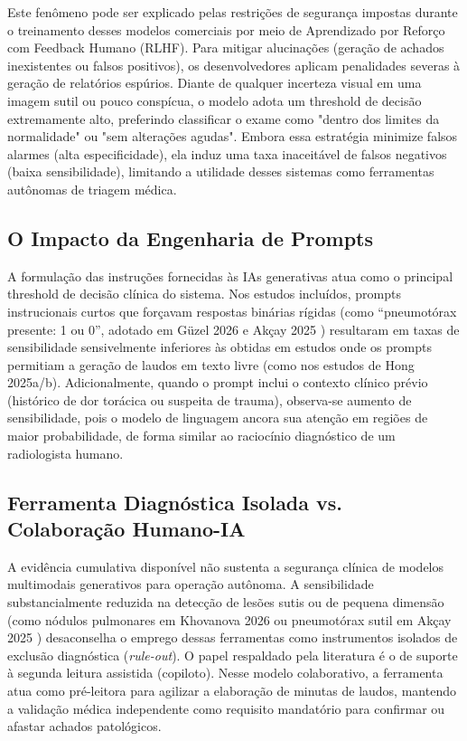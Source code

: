 \documentclass[12pt,a4paper]{article}
\begin{document}
Este fenômeno pode ser explicado pelas restrições de segurança impostas durante o treinamento desses modelos comerciais por meio de Aprendizado por Reforço com Feedback Humano (RLHF). Para mitigar alucinações (geração de achados inexistentes ou falsos positivos), os desenvolvedores aplicam penalidades severas à geração de relatórios espúrios. Diante de qualquer incerteza visual em uma imagem sutil ou pouco conspícua, o modelo adota um threshold de decisão extremamente alto, preferindo classificar o exame como "dentro dos limites da normalidade" ou "sem alterações agudas". Embora essa estratégia minimize falsos alarmes (alta especificidade), ela induz uma taxa inaceitável de falsos negativos (baixa sensibilidade), limitando a utilidade desses sistemas como ferramentas autônomas de triagem médica.

\subsection{O Impacto da Engenharia de Prompts}
A formulação das instruções fornecidas às IAs generativas atua como o principal threshold de decisão clínica do sistema. Nos estudos incluídos, prompts instrucionais curtos que forçavam respostas binárias rígidas (como ``pneumotórax presente: 1 ou 0'', adotado em Güzel 2026 \cite{guzel} e Akçay 2025 \cite{akcay}) resultaram em taxas de sensibilidade sensivelmente inferiores às obtidas em estudos onde os prompts permitiam a geração de laudos em texto livre (como nos estudos de Hong 2025a/b). Adicionalmente, quando o prompt inclui o contexto clínico prévio (histórico de dor torácica ou suspeita de trauma), observa-se aumento de sensibilidade, pois o modelo de linguagem ancora sua atenção em regiões de maior probabilidade, de forma similar ao raciocínio diagnóstico de um radiologista humano.

\subsection{Ferramenta Diagnóstica Isolada vs. Colaboração Humano-IA}
A evidência cumulativa disponível não sustenta a segurança clínica de modelos multimodais generativos para operação autônoma. A sensibilidade substancialmente reduzida na detecção de lesões sutis ou de pequena dimensão (como nódulos pulmonares em Khovanova 2026 \cite{khovanova} ou pneumotórax sutil em Akçay 2025 \cite{akcay}) desaconselha o emprego dessas ferramentas como instrumentos isolados de exclusão diagnóstica (\textit{rule-out}). O papel respaldado pela literatura é o de suporte à segunda leitura assistida (copiloto). Nesse modelo colaborativo, a ferramenta atua como pré-leitora para agilizar a elaboração de minutas de laudos, mantendo a validação médica independente como requisito mandatório para confirmar ou afastar achados patológicos.
\end{document}
